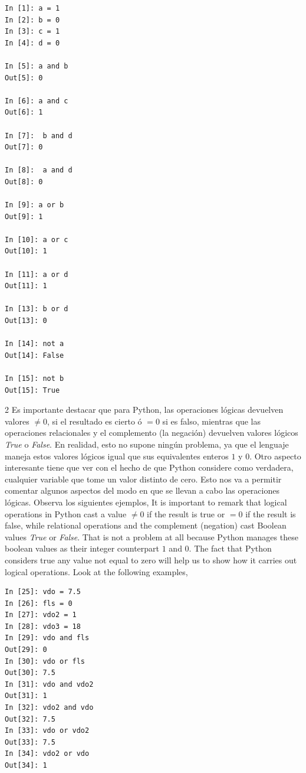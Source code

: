 \begin{center}
\begin{minipage}{.2\textwidth}
\begin{verbatim}
In [1]: a = 1
In [2]: b = 0
In [3]: c = 1
In [4]: d = 0

In [5]: a and b
Out[5]: 0

In [6]: a and c
Out[6]: 1

In [7]:  b and d
Out[7]: 0

In [8]:  a and d
Out[8]: 0

In [9]: a or b
Out[9]: 1

In [10]: a or c
Out[10]: 1

In [11]: a or d
Out[11]: 1

In [13]: b or d
Out[13]: 0

In [14]: not a
Out[14]: False

In [15]: not b
Out[15]: True
\end{verbatim}
\end{minipage}
\end{center}

\begin{paracol}{2}
Es importante destacar que para Python, las operaciones lógicas devuelven valores $\neq 0$, si el resultado es cierto ó $=0$ si es falso, mientras que las operaciones relacionales y el complemento (la negación) devuelven valores lógicos \emph{True} o \emph{False}. En realidad, esto no supone ningún problema, ya que el lenguaje maneja estos valores lógicos igual que sus equivalentes enteros $1$ y $0$. Otro aspecto interesante tiene que ver con el hecho de que Python considere como verdadera, cualquier variable que tome un valor distinto de cero. Esto nos va a permitir comentar algunos aspectos del modo en que se llevan a cabo las operaciones lógicas. Observa los siguientes ejemplos,
\switchcolumn
It is important to remark that logical operations in Python cast a value $\neq 0$ if the result is true or $=0$ if the result is false, while relational operations and the complement (negation) cast Boolean values \emph{True} or \emph{False}. That is not a problem at all because Python manages these boolean values as their integer counterpart $1$ and $0$. The fact that Python considers true any value not equal to zero will help us to show how it carries out logical operations. Look at the following examples,  
\end{paracol}

\begin{center}
    \begin{minipage}{.2\textwidth}
\begin{verbatim}
In [25]: vdo = 7.5
In [26]: fls = 0
In [27]: vdo2 = 1
In [28]: vdo3 = 18
In [29]: vdo and fls
Out[29]: 0
In [30]: vdo or fls
Out[30]: 7.5
In [31]: vdo and vdo2
Out[31]: 1
In [32]: vdo2 and vdo
Out[32]: 7.5
In [33]: vdo or vdo2
Out[33]: 7.5
In [34]: vdo2 or vdo
Out[34]: 1
\end{verbatim}
    \end{minipage}
\end{center}


